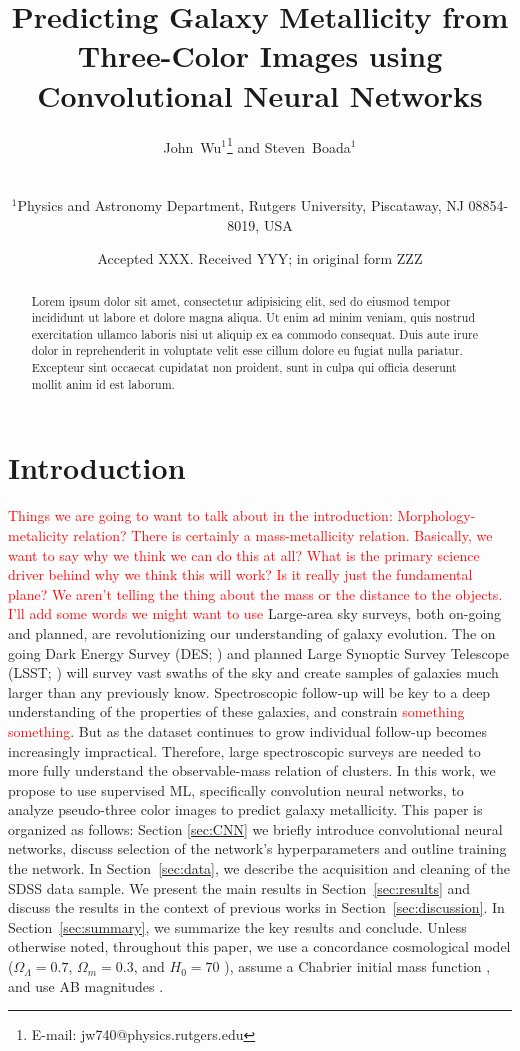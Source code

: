 \documentclass[fleqn,usenatbib]{mnras}
\title[Metallicity with CNNs]{Predicting Galaxy Metallicity from Three-Color Images using Convolutional Neural Networks}
\author[Wu and Boada]
{\parbox{\textwidth}{John~Wu$^{1}$\thanks{E-mail: jw740@physics.rutgers.edu} and
Steven~Boada$^{1}$}\vspace{0.4cm}\
\\
\parbox{\textwidth}{$^{1}$Physics and Astronomy Department, Rutgers University, Piscataway, NJ 08854-8019, USA\\}}
\date{Accepted XXX. Received YYY; in original form ZZZ}
\newcommand{\editorial}[1]{\textcolor{red}{#1}}
\begin{document}
\label{firstpage}
\pagerange{\pageref{firstpage}--\pageref{lastpage}}
\maketitle

\begin{abstract}
\noindent
Lorem ipsum dolor sit amet, consectetur adipisicing elit, sed do eiusmod tempor incididunt ut labore et dolore magna aliqua. Ut enim ad minim veniam, quis nostrud exercitation ullamco laboris nisi ut aliquip ex ea commodo consequat. Duis aute irure dolor in reprehenderit in voluptate velit esse cillum dolore eu fugiat nulla pariatur. Excepteur sint occaecat cupidatat non proident, sunt in culpa qui officia deserunt mollit anim id est laborum.
\end{abstract}

\section{Introduction}\label{sec:introduction}
\editorial{Things we are going to want to talk about in the introduction: Morphology-metalicity relation? There is certainly a mass-metallicity relation. Basically, we want to say why we think we can do this at all? What is the primary science driver behind why we think this will work? Is it really just the fundamental plane? We aren't telling the thing about the mass or the distance to the objects.}
\editorial{I'll add some words we might want to use}
Large-area sky surveys, both on-going and planned, are revolutionizing our understanding of galaxy evolution. The on going Dark Energy Survey (DES; \citealt{DES2005}) and planned Large Synoptic Survey Telescope (LSST; \citealt{LSST2012}) will survey vast swaths of the sky and create samples of galaxies much larger than any previously know. Spectroscopic follow-up will be key to a deep understanding of the properties of these galaxies, and constrain \editorial{something something}. But as the dataset continues to grow individual follow-up becomes increasingly impractical. Therefore, large spectroscopic surveys are needed to more fully understand the observable-mass relation of clusters.
In this work, we propose to use supervised ML, specifically convolution neural networks, to analyze pseudo-three color images to predict galaxy metallicity.
This paper is organized as follows: Section \ref{sec:CNN} we briefly introduce convolutional neural networks, discuss selection of the network's hyperparameters and outline training the network. In Section~\ref{sec:data}, we describe the acquisition and cleaning of the SDSS data sample. We present the main results in Section~\ref{sec:results} and discuss the results in the context of previous works in Section~\ref{sec:discussion}. In Section~\ref{sec:summary}, we summarize the key results and conclude.
Unless otherwise noted, throughout this paper, we use a concordance cosmological model ($\Omega_\Lambda = 0.7$, $\Omega_m = 0.3$, and $H_0= 70$ \kms \mpc), assume a Chabrier initial mass function \citep{Chabrier2003}, and use AB magnitudes \citep{Oke1974}.
\end{document}
